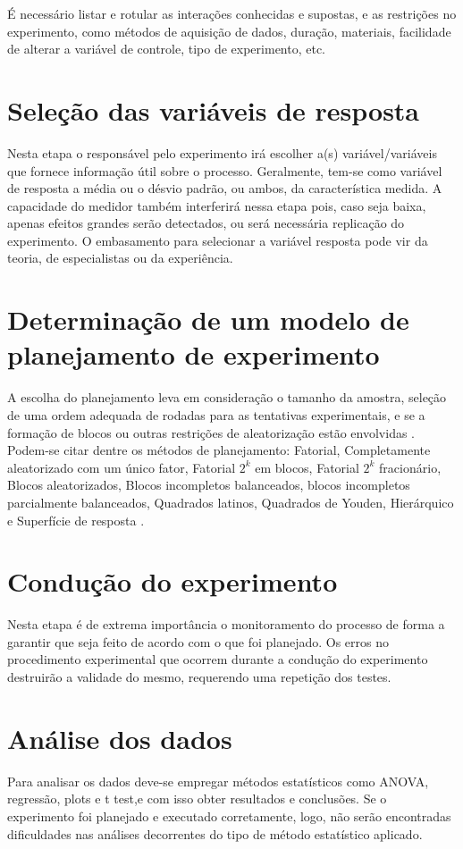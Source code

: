 É necessário listar e rotular as interações conhecidas e supostas, e as restrições no experimento, como métodos de aquisição de dados, duração, materiais, facilidade de alterar a variável de controle, tipo de experimento, etc.


\section{Seleção das variáveis de resposta}
Nesta etapa o responsável pelo experimento irá escolher a(s) variável/variáveis que fornece informação útil sobre o processo. Geralmente, tem-se como variável de resposta a média ou o désvio padrão, ou ambos, da característica medida.
A capacidade do medidor também interferirá nessa etapa pois, caso seja baixa, apenas efeitos grandes serão detectados, ou será necessária replicação do experimento. O embasamento para selecionar a variável resposta pode vir da teoria, de especialistas ou da experiência.

\section{Determinação de um modelo de planejamento de experimento}
A escolha do planejamento leva em consideração o tamanho da amostra, seleção de uma ordem adequada de rodadas para as tentativas experimentais, e se a formação de blocos ou outras restrições de aleatorização estão envolvidas \cite{Experimentos}. Podem-se citar dentre os métodos de planejamento: Fatorial, Completamente aleatorizado com um único fator, Fatorial $2^{k}$ em blocos, Fatorial $2^{k}$ fracionário, Blocos aleatorizados, Blocos incompletos balanceados, blocos incompletos parcialmente balanceados, Quadrados latinos, Quadrados de Youden, Hierárquico e Superfície de resposta \cite{montgomery2013estatistica}.

\section{Condução do experimento}
Nesta etapa é de extrema importância o monitoramento do processo de forma a garantir que seja feito de acordo com o que foi planejado. Os erros no procedimento experimental que ocorrem durante a condução do experimento destruirão a validade do mesmo, requerendo uma repetição dos testes.

\section{Análise dos dados}
Para analisar os dados deve-se empregar métodos estatísticos como ANOVA, regressão, plots e t test,e com isso obter resultados e conclusões. Se o experimento foi planejado e executado corretamente, logo, não serão encontradas dificuldades nas análises decorrentes do tipo de método estatístico aplicado. 

